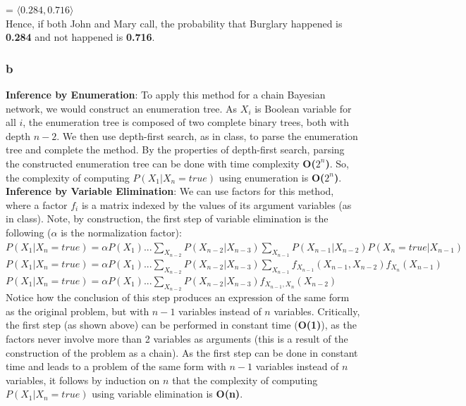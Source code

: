 \documentclass{article}
\begin{document}
\indent 
= $\langle 0.284, 0.716 \rangle$\\ 

\noindent 
Hence, if both John and Mary call, the probability that Burglary happened is \textbf{0.284} and not happened is \textbf{0.716}. 

\subsubsection*{b}
\textbf{Inference by Enumeration}: To apply this method for a chain Bayesian network, we would construct an enumeration tree. As $X_i$ is Boolean variable for all $i$, the enumeration tree is composed of two complete binary trees, both with depth $n-2$. We then use depth-first search, as in class, to parse the enumeration tree and complete the method. By the properties of depth-first search, parsing the constructed enumeration tree can be done with time complexity \textbf{O($2^{n}$)}. So, the complexity of computing $P(X_1 | X_n = true)$ using enumeration is \textbf{O($2^{n}$)}.  \\

\noindent
\textbf{Inference by Variable Elimination}: We can use factors for this method, where a factor $f_i$ is a matrix indexed by the values of its argument variables (as in class). Note, by construction, the first step of variable elimination is the following ($\alpha$ is the normalization factor): \\

\noindent
$P(X_1 | X_n = true) = \alpha P(X_1)... \sum_{X_{n-2}}P(X_{n-2} | X_{n-3}) \sum_{X_{n-1}}P(X_{n-1} | X_{n-2})P(X_n = true | X_{n-1})$ \\

\noindent
$P(X_1 | X_n = true) = \alpha P(X_1)... \sum_{X_{n-2}}P(X_{n-2} | X_{n-3}) \sum_{X_{n-1}}f_{X_{n-1}}(X_{n-1}, X_{n-2})f_{X_n}(X_{n-1})$ \\

\noindent
$P(X_1 | X_n = true) = \alpha P(X_1)... \sum_{X_{n-2}}P(X_{n-2} | X_{n-3})f_{X_{n-1}, X_n}(X_{n-2})$ \\

\noindent 
Notice how the conclusion of this step produces an expression of the same form as the original problem, but with $n-1$ variables instead of $n$ variables. Critically, the first step (as shown above) can be performed in constant time (\textbf{O(1)}), as the factors never involve more than 2 variables as arguments (this is a result of the construction of the problem as a chain). As the first step can be done in constant time and leads to a problem of the same form with $n-1$ variables instead of $n$ variables, it follows by induction on $n$ that the complexity of computing $P(X_1 | X_n = true)$ using variable elimination is \textbf{O(n)}.
\end{document}
